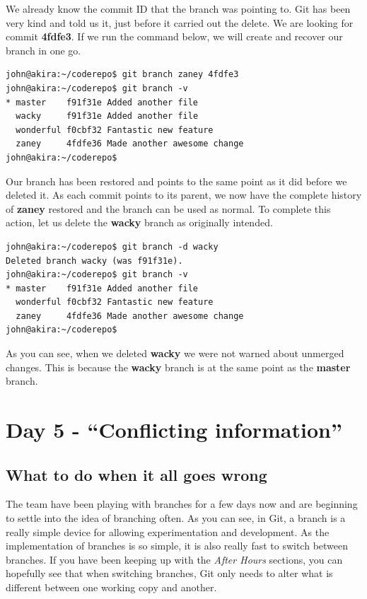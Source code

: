 We already know the commit ID that the branch was pointing to.  Git has been very kind and told us it, just before it carried out the delete.  We are looking for commit \textbf{4fdfe3}.  If we run the command below, we will create and recover our branch in one go.

\begin{Verbatim}[frame=leftline,framerule=1mm,fontsize=\relsize{-3}] 
john@akira:~/coderepo$ git branch zaney 4fdfe3
john@akira:~/coderepo$ git branch -v
* master    f91f31e Added another file
  wacky     f91f31e Added another file
  wonderful f0cbf32 Fantastic new feature
  zaney     4fdfe36 Made another awesome change
john@akira:~/coderepo$ 
\end{Verbatim}

Our branch has been restored and points to the same point as it did before we deleted it.  As each commit points to its parent, we now have the complete history of \textbf{zaney} restored and the branch can be used as normal.  To complete this action, let us delete the \textbf{wacky} branch as originally intended.

\begin{Verbatim}[frame=leftline,framerule=1mm,fontsize=\relsize{-3}] 
john@akira:~/coderepo$ git branch -d wacky
Deleted branch wacky (was f91f31e).
john@akira:~/coderepo$ git branch -v
* master    f91f31e Added another file
  wonderful f0cbf32 Fantastic new feature
  zaney     4fdfe36 Made another awesome change
john@akira:~/coderepo$ 
\end{Verbatim}

As you can see, when we deleted \textbf{wacky} we were not warned about unmerged changes.  This is because the \textbf{wacky} branch is at the same point as the \textbf{master} branch.  

\section{Day 5 - ``Conflicting information''}
\subsection{What to do when it all goes wrong}

The team have been playing with branches for a few days now and are beginning to settle into the idea of branching often.  As you can see, in Git, a branch is a really simple device for allowing experimentation and development.  As the implementation of branches is so simple, it is also really fast to switch between branches.  If you have been keeping up with the \emph{After Hours} sections, you can hopefully see that when switching branches, Git only needs to alter what is different between one working copy and another.

